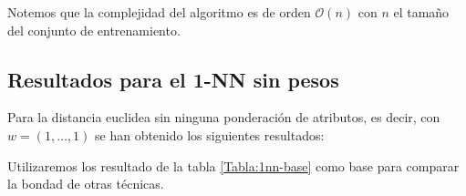   Notemos que la complejidad del algoritmo es de orden $\mathcal{O}(n)$ con $n$ el tamaño 
  del conjunto de entrenamiento.

\subsection{Resultados para el 1-NN sin pesos} 

  Para la distancia euclidea sin ninguna ponderación de atributos, es decir, con 
  $w = (1,\ldots, 1)$ se han obtenido los siguientes resultados: 
  
  \begin{table}[h]
    \centering
      \caption{Métricas de clasificación y tiempo  para el algoritmo 1-NN sin ponderación de pesos en los diferentes conjuntos de datos}
      \label{Tabla:1nn-base}
\end{table}

Utilizaremos los resultado de la tabla \ref{Tabla:1nn-base} como base para comparar la bondad de otras técnicas.

